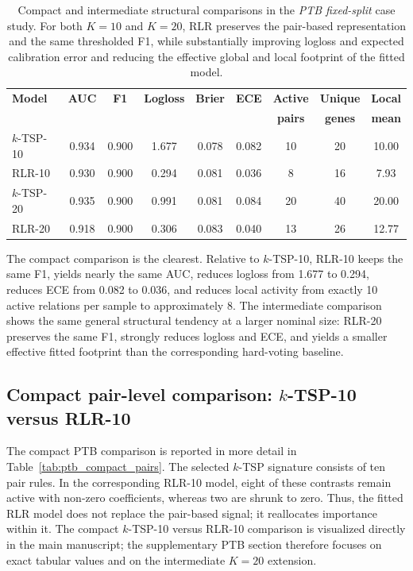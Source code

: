 \documentclass[11pt, a4paper]{article}
\newcommand{\stdtablefont}{\small}
\newcommand{\stdtablelayout}{%
  \stdtablefont
  \setlength{\tabcolsep}{4pt}
  \renewcommand{\arraystretch}{1.2}
}
\begin{document}
\begin{table}[!htbp]
\centering
\caption{Compact and intermediate structural comparisons in the \emph{PTB fixed-split} case study. For both $K=10$ and $K=20$, RLR preserves the pair-based representation and the same thresholded F1, while substantially improving logloss and expected calibration error and reducing the effective global and local footprint of the fitted model.}
\label{tab:ptb_case_summary}
{\stdtablelayout
\begin{tabular}{lcccccccc}
\toprule
\textbf{Model} & \textbf{AUC} & \textbf{F1} & \textbf{Logloss} & \textbf{Brier} & \textbf{ECE} & \textbf{Active} & \textbf{Unique} & \textbf{Local} \\
 & & & & & & \textbf{pairs} & \textbf{genes} & \textbf{mean} \\
\midrule
$k$-TSP-10 & 0.934 & 0.900 & 1.677 & 0.078 & 0.082 & 10 & 20 & 10.00 \\
RLR-10     & 0.930 & 0.900 & 0.294 & 0.081 & 0.036 & 8  & 16 & 7.93 \\
\midrule
$k$-TSP-20 & 0.935 & 0.900 & 0.991 & 0.081 & 0.084 & 20 & 40 & 20.00 \\
RLR-20     & 0.918 & 0.900 & 0.306 & 0.083 & 0.040 & 13 & 26 & 12.77 \\
\bottomrule
\end{tabular}
}
\end{table}

The compact comparison is the clearest. Relative to $k$-TSP-10, RLR-10 keeps the same F1, yields nearly the same AUC, reduces logloss from 1.677 to 0.294, reduces ECE from 0.082 to 0.036, and reduces local activity from exactly 10 active relations per sample to approximately 8. The intermediate comparison shows the same general structural tendency at a larger nominal size: RLR-20 preserves the same F1, strongly reduces logloss and ECE, and yields a smaller effective fitted footprint than the corresponding hard-voting baseline.

\subsection{Compact pair-level comparison: $k$-TSP-10 versus RLR-10}

The compact PTB comparison is reported in more detail in Table~\ref{tab:ptb_compact_pairs}. The selected $k$-TSP signature consists of ten pair rules. In the corresponding RLR-10 model, eight of these contrasts remain active with non-zero coefficients, whereas two are shrunk to zero. Thus, the fitted RLR model does not replace the pair-based signal; it reallocates importance within it. The compact $k$-TSP-10 versus RLR-10 comparison is visualized directly in the main manuscript; the supplementary PTB section therefore focuses on exact tabular values and on the intermediate $K=20$ extension.
\end{document}

